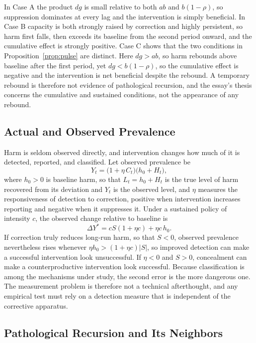 \documentclass[12pt]{article}
\theoremstyle{remark}
\begin{document}
In Case A the product $dg$ is small relative to both $ab$ and $b(1-\rho)$, so suppression dominates at every lag and the intervention is simply beneficial. In Case B capacity is both strongly raised by correction and highly persistent, so harm first falls, then exceeds its baseline from the second period onward, and the cumulative effect is strongly positive. Case C shows that the two conditions in Proposition~\ref{prop:pulse} are distinct. Here $dg > ab$, so harm rebounds above baseline after the first period, yet $dg < b(1-\rho)$, so the cumulative effect is negative and the intervention is net beneficial despite the rebound. A temporary rebound is therefore not evidence of pathological recursion, and the essay's thesis concerns the cumulative and sustained conditions, not the appearance of any rebound.

\subsection{Actual and Observed Prevalence}

Harm is seldom observed directly, and intervention changes how much of it is detected, reported, and classified. Let observed prevalence be
\begin{equation}
Y_t = \bigl(1 + \eta\, C_t\bigr)\bigl(h_0 + H_t\bigr),
\end{equation}
where $h_0 > 0$ is baseline harm, so that $L_t = h_0 + H_t$ is the true level of harm recovered from its deviation and $Y_t$ is the observed level, and $\eta$ measures the responsiveness of detection to correction, positive when intervention increases reporting and negative when it suppresses it. Under a sustained policy of intensity $c$, the observed change relative to baseline is
\begin{equation}
\Delta Y^{*} = c S (1 + \eta c) + \eta c\, h_0 .
\end{equation}
If correction truly reduces long-run harm, so that $S < 0$, observed prevalence nevertheless rises whenever $\eta h_0 > (1 + \eta c)|S|$, so improved detection can make a successful intervention look unsuccessful. If $\eta < 0$ and $S > 0$, concealment can make a counterproductive intervention look successful. Because classification is among the mechanisms under study, the second error is the more dangerous one. The measurement problem is therefore not a technical afterthought, and any empirical test must rely on a detection measure that is independent of the corrective apparatus.

\subsection{Pathological Recursion and Its Neighbors}
\end{document}
